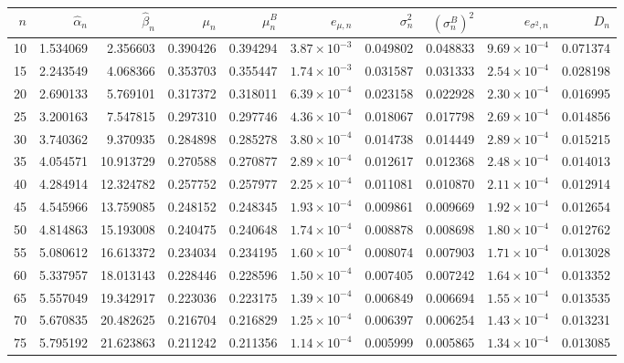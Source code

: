 \begin{tabular}{@{}rrrrrrrrrr@{}}
\hline
$n$ & $\widehat\alpha_n$ & $\widehat\beta_n$ & $\mu_n$ & $\mu_n^B$ & $e_{\mu,n}$ & $\sigma_n^2$ & $(\sigma_n^B)^2$ & $e_{\sigma^2,n}$ & $D_n$ \\
\hline
10 & 1.534069 & 2.356603 & 0.390426 & 0.394294 & $3.87\times10^{-3}$ & 0.049802 & 0.048833 & $9.69\times10^{-4}$ & 0.071374 \\
15 & 2.243549 & 4.068366 & 0.353703 & 0.355447 & $1.74\times10^{-3}$ & 0.031587 & 0.031333 & $2.54\times10^{-4}$ & 0.028198 \\
20 & 2.690133 & 5.769101 & 0.317372 & 0.318011 & $6.39\times10^{-4}$ & 0.023158 & 0.022928 & $2.30\times10^{-4}$ & 0.016995 \\
25 & 3.200163 & 7.547815 & 0.297310 & 0.297746 & $4.36\times10^{-4}$ & 0.018067 & 0.017798 & $2.69\times10^{-4}$ & 0.014856 \\
30 & 3.740362 & 9.370935 & 0.284898 & 0.285278 & $3.80\times10^{-4}$ & 0.014738 & 0.014449 & $2.89\times10^{-4}$ & 0.015215 \\
35 & 4.054571 & 10.913729 & 0.270588 & 0.270877 & $2.89\times10^{-4}$ & 0.012617 & 0.012368 & $2.48\times10^{-4}$ & 0.014013 \\
40 & 4.284914 & 12.324782 & 0.257752 & 0.257977 & $2.25\times10^{-4}$ & 0.011081 & 0.010870 & $2.11\times10^{-4}$ & 0.012914 \\
45 & 4.545966 & 13.759085 & 0.248152 & 0.248345 & $1.93\times10^{-4}$ & 0.009861 & 0.009669 & $1.92\times10^{-4}$ & 0.012654 \\
50 & 4.814863 & 15.193008 & 0.240475 & 0.240648 & $1.74\times10^{-4}$ & 0.008878 & 0.008698 & $1.80\times10^{-4}$ & 0.012762 \\
55 & 5.080612 & 16.613372 & 0.234034 & 0.234195 & $1.60\times10^{-4}$ & 0.008074 & 0.007903 & $1.71\times10^{-4}$ & 0.013028 \\
60 & 5.337957 & 18.013143 & 0.228446 & 0.228596 & $1.50\times10^{-4}$ & 0.007405 & 0.007242 & $1.64\times10^{-4}$ & 0.013352 \\
65 & 5.557049 & 19.342917 & 0.223036 & 0.223175 & $1.39\times10^{-4}$ & 0.006849 & 0.006694 & $1.55\times10^{-4}$ & 0.013535 \\
70 & 5.670835 & 20.482625 & 0.216704 & 0.216829 & $1.25\times10^{-4}$ & 0.006397 & 0.006254 & $1.43\times10^{-4}$ & 0.013231 \\
75 & 5.795192 & 21.623863 & 0.211242 & 0.211356 & $1.14\times10^{-4}$ & 0.005999 & 0.005865 & $1.34\times10^{-4}$ & 0.013085 \\

\end{tabular}
